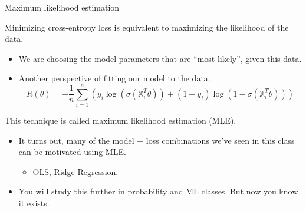 \documentclass[aspectratio=169]{../latex_main/tntbeamer}  %
\begin{document}
	
	\begin{frame}{Maximum likelihood estimation}

        Minimizing cross-entropy loss is equivalent to maximizing the likelihood of the data.
   	    \begin{itemize}
   	        \item We are choosing the model parameters that are “most likely”, given this data.
   	        \item Another perspective of fitting our model to the data.
   	        \begin{equation*}
   	            R(\theta) = -\frac{1}{n}\sum\limits_{i=1}^n(y_i\log(\sigma (\mathbb{X}_i^T\theta)) + (1 - y_i)\log(1-\sigma (\mathbb{X}_i^T\theta)))
   	        \end{equation*}
   	    \end{itemize}
        This technique is called maximum likelihood estimation (MLE).
        \begin{itemize}
            \item It turns out, many of the model + loss combinations we’ve seen in this class can be motivated using MLE.
            \begin{itemize}
                \item OLS, Ridge Regression.
            \end{itemize}
            \item You will study this further in probability and ML classes. But now you know it exists.
        \end{itemize}
	\end{frame}
\end{document}
